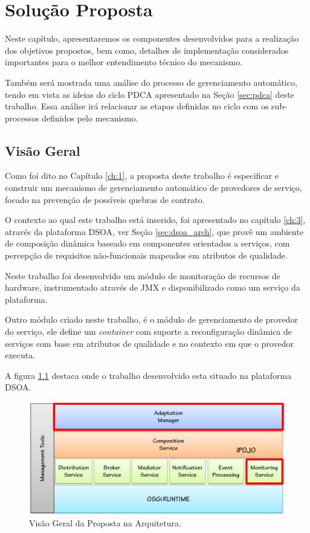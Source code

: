 \chapter{Solução Proposta}
\label{ch:4}

Neste capítulo, apresentaremos os componentes desenvolvidos para a realização dos objetivos propostos, bem como, detalhes de implementação considerados importantes para o melhor entendimento técnico do mecanismo. 

Também será mostrada uma análise do processo de gerenciamento automático, tendo em vista as ideias do ciclo PDCA apresentado na Seção \ref{sec:pdca} deste trabalho. Essa análise irá relacionar as etapas definidas no ciclo com os sub-processos definidos pelo mecanismo.

\section{Visão Geral}
Como foi dito no Capítulo \ref{ch:1}, a proposta deste trabalho é especificar e construir um mecanismo de gerenciamento automático de provedores de serviço, focado na prevenção de possíveis quebras de contrato.

O contexto ao qual este trabalho está inserido, foi apresentado no capítulo \ref{ch:3}, através da plataforma DSOA, ver Seção \ref{sec:dsoa_arch}, que provê um ambiente de composição dinâmica baseado em componentes orientados a serviços, com percepção de requisitos não-funcionais mapeados em atributos de qualidade.

Neste trabalho foi desenvolvido um módulo de monitoração de recursos de hardware, instrumentado através de JMX e disponibilizado como um serviço da plataforma. 

Outro módulo criado neste trabalho, é o módulo de gerenciamento de provedor do serviço, ele define um \textit{container} com suporte a reconfiguração dinâmica de serviços com base em atributos de qualidade e no contexto em que o provedor executa.

A figura \ref{fig:proposal} destaca onde o trabalho desenvolvido esta situado na plataforma DSOA.

\begin{figure}[htp]
\centering
\includegraphics[width=14cm]{chapters/chapter4/dsoa-provider-manager.png}
\caption[Visão Geral da Proposta na Arquitetura]{Visão Geral da Proposta na Arquitetura.}
\label{fig:proposal}
\end{figure}

